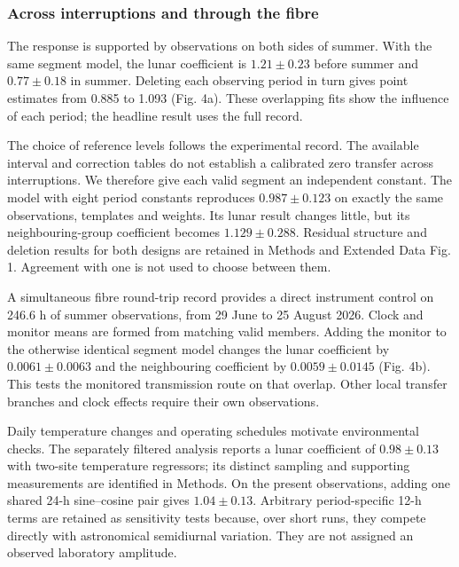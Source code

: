 \documentclass[
  10pt,
  a4paper,
]{article}
\begin{document}
\hypertarget{across-interruptions-and-through-the-fibre}{%
\subsubsection{Across interruptions and through the
fibre}\label{across-interruptions-and-through-the-fibre}}

The response is supported by observations on both sides of summer. With
the same segment model, the lunar coefficient is \(1.21\pm0.23\) before
summer and \(0.77\pm0.18\) in summer. Deleting each observing period in
turn gives point estimates from 0.885 to 1.093 (Fig. 4a). These
overlapping fits show the influence of each period; the headline result
uses the full record.

The choice of reference levels follows the experimental record. The
available interval and correction tables do not establish a calibrated
zero transfer across interruptions. We therefore give each valid segment
an independent constant. The model with eight period constants
reproduces \(0.987\pm0.123\) on exactly the same observations, templates
and weights. Its lunar result changes little, but its neighbouring-group
coefficient becomes \(1.129\pm0.288\). Residual structure and deletion
results for both designs are retained in Methods and Extended Data Fig.
1. Agreement with one is not used to choose between them.

A simultaneous fibre round-trip record provides a direct instrument
control on 246.6 h of summer observations, from 29 June to 25 August
2026. Clock and monitor means are formed from matching valid members.
Adding the monitor to the otherwise identical segment model changes the
lunar coefficient by \(0.0061\pm0.0063\) and the neighbouring
coefficient by \(0.0059\pm0.0145\) (Fig. 4b). This tests the monitored
transmission route on that overlap. Other local transfer branches and
clock effects require their own observations.

Daily temperature changes and operating schedules motivate environmental
checks. The separately filtered analysis reports a lunar coefficient of
\(0.98\pm0.13\) with two-site temperature regressors; its distinct
sampling and supporting measurements are identified in Methods. On the
present observations, adding one shared 24-h sine--cosine pair gives
\(1.04\pm0.13\). Arbitrary period-specific 12-h terms are retained as
sensitivity tests because, over short runs, they compete directly with
astronomical semidiurnal variation. They are not assigned an observed
laboratory amplitude.
\end{document}

